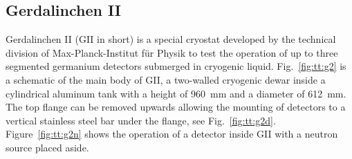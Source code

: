 \subsection{Gerdalinchen II}
\label{sec:tt:gii}
Gerdalinchen II (GII in short) is a special cryostat developed by the technical division of Max-Planck-Institut f\"ur Physik to test the operation of up to three segmented germanium detectors submerged in cryogenic liquid. Fig.~\ref{fig:tt:g2} is a schematic of the main body of GII, a two-walled cryogenic dewar inside a cylindrical aluminum tank with a height of 960~mm and a diameter of 612~mm. The top flange can be removed upwards allowing the mounting of detectors to a vertical stainless steel bar under the flange, see Fig.~\ref{fig:tt:g2d}. Figure~\ref{fig:tt:g2n} shows the operation of a detector inside GII with a neutron source placed aside. 

